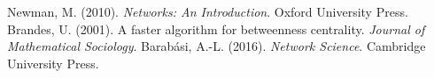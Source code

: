 \documentclass[11pt,a4paper]{article}
\begin{document}

\begin{thebibliography}{9}
 Newman, M. (2010). \emph{Networks: An Introduction}. Oxford University Press.
 Brandes, U. (2001). A faster algorithm for betweenness centrality. \emph{Journal of Mathematical Sociology}.
 Barabási, A.-L. (2016). \emph{Network Science}. Cambridge University Press.
\end{thebibliography}
\end{document}
